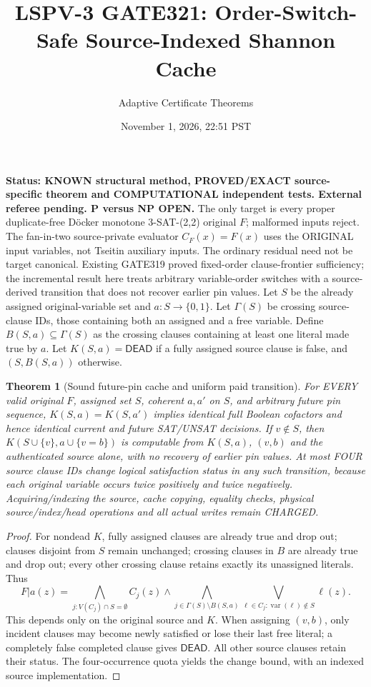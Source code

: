 \documentclass[11pt]{article}
\title{LSPV-3 GATE321: Order-Switch-Safe Source-Indexed Shannon Cache}
\author{Adaptive Certificate Theorems}
\date{November 1, 2026, 22:51 PST}
\newtheorem{theorem}{Theorem}
\begin{document}
\maketitle
\noindent\textbf{Status: KNOWN structural method, PROVED/EXACT source-specific theorem and COMPUTATIONAL independent tests. External referee pending. P versus NP OPEN.}
The only target is every proper duplicate-free D\"ocker monotone 3-SAT-(2,2) original $F$; malformed inputs reject. The fan-in-two source-private evaluator $C_F(x)=F(x)$ uses the ORIGINAL input variables, not Tseitin auxiliary inputs. The ordinary residual need not be target canonical. Existing GATE319 proved fixed-order clause-frontier sufficiency; the incremental result here treats arbitrary variable-order switches with a source-derived transition that does not recover earlier pin values.
Let $S$ be the already assigned original-variable set and $a:S\to\{0,1\}$. Let $\Gamma(S)$ be crossing source-clause IDs, those containing both an assigned and a free variable. Define $B(S,a)\subseteq\Gamma(S)$ as the crossing clauses containing at least one literal made true by $a$. Let $K(S,a)=\mathsf{DEAD}$ if a fully assigned source clause is false, and $(S,B(S,a))$ otherwise.
\begin{theorem}[Sound future-pin cache and uniform paid transition]
For EVERY valid original $F$, assigned set $S$, coherent $a,a'$ on $S$, and arbitrary future pin sequence, $K(S,a)=K(S,a')$ implies identical full Boolean cofactors and hence identical current and future SAT/UNSAT decisions. If $v\notin S$, then $K(S\cup\{v\},a\cup\{v=b\})$ is computable from $K(S,a)$, $(v,b)$ and the authenticated source alone, with no recovery of earlier pin values. At most FOUR source clause IDs change logical satisfaction status in any such transition, because each original variable occurs twice positively and twice negatively. Acquiring/indexing the source, cache copying, equality checks, physical source/index/head operations and all actual writes remain CHARGED.
\end{theorem}
\begin{proof}
For nondead $K$, fully assigned clauses are already true and drop out; clauses disjoint from $S$ remain unchanged; crossing clauses in $B$ are already true and drop out; every other crossing clause retains exactly its unassigned literals. Thus
\[
F|a(z)=\bigwedge_{j:V(C_j)\cap S=\emptyset}C_j(z)
\wedge\bigwedge_{j\in\Gamma(S)\setminus B(S,a)}
\bigvee_{\ell\in C_j:\operatorname{var}(\ell)\notin S}\ell(z).
\]
This depends only on the original source and $K$. When assigning $(v,b)$, only incident clauses may become newly satisfied or lose their last free literal; a completely false completed clause gives $\mathsf{DEAD}$. All other source clauses retain their status. The four-occurrence quota yields the change bound, with an indexed source implementation. \end{proof}
\end{document}
